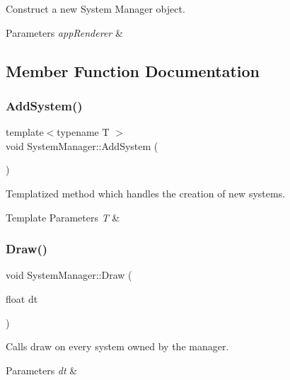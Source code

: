 Construct a new System Manager object. 


\begin{DoxyParams}{Parameters}
{\em app\+Renderer} & \\
\hline
\end{DoxyParams}


\subsection{Member Function Documentation}
\mbox{\label{classSystemManager_a231ba9b19cf46c62334fd9442ca66602}} 
\subsubsection{\texorpdfstring{Add\+System()}{AddSystem()}}
{\footnotesize\ttfamily template$<$typename T $>$ \\
void System\+Manager\+::\+Add\+System (\begin{DoxyParamCaption}{ }\end{DoxyParamCaption})}



Templatized method which handles the creation of new systems. 


\begin{DoxyTemplParams}{Template Parameters}
{\em T} & \\
\hline
\end{DoxyTemplParams}
\mbox{\label{classSystemManager_a1bab92d089c6c9546776fabf6e1e3098}} 
\subsubsection{\texorpdfstring{Draw()}{Draw()}}
{\footnotesize\ttfamily void System\+Manager\+::\+Draw (\begin{DoxyParamCaption}\item[{float}]{dt }\end{DoxyParamCaption})}



Calls draw on every system owned by the manager. 


\begin{DoxyParams}{Parameters}
{\em dt} & \\
\hline
\end{DoxyParams}
\mbox{\label{classSystemManager_aaa98d81346a3d7ef4a8d8fb109525e4c}} 
